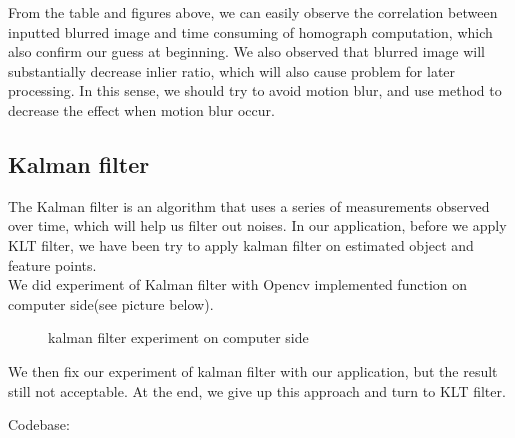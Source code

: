 \documentclass[10pt,conference,compsocconf]{IEEEtran}
\begin{document}
From the table and figures above, we can easily observe the correlation between inputted blurred image and time consuming of homograph computation, which also confirm our guess at beginning. We also observed that blurred image will substantially decrease inlier ratio, which will also cause problem for later processing. In this sense, we should try to avoid motion blur, and use method to decrease the effect when motion blur occur.

\subsection{Kalman filter}

The Kalman filter is an algorithm that uses a series of measurements observed over time, which will help us filter out noises. In our application, before we apply KLT filter, we have been try to apply kalman filter on estimated object and feature points.\\

We did experiment of Kalman filter with Opencv implemented  function on computer side(see picture below).\\

\begin{figure}[h!]
  \centering
  \caption{kalman filter experiment on computer side}
\end{figure}

We then fix our experiment of kalman filter with our application, but the result still not acceptable. At the end, we give up this approach and turn to KLT filter.

\appendix
Codebase:\\\\
\end{document}

